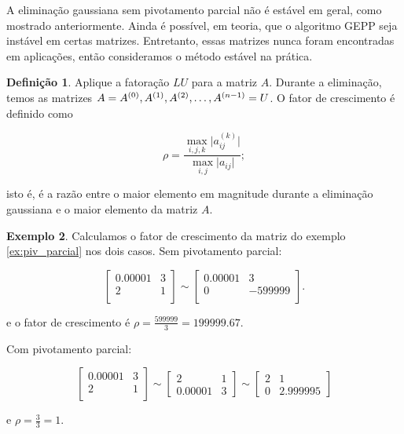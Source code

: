 \documentclass{article}
\theoremstyle{plain}
\theoremstyle{definition}
\newtheorem{defn}{Definição}[section]
\newtheorem{exmp}[defn]{Exemplo}
\theoremstyle{remark}
\begin{document}
A eliminação gaussiana sem pivotamento parcial não é estável em geral, como mostrado anteriormente. Ainda é possível, em teoria, que o algoritmo GEPP seja instável em certas matrizes. Entretanto, essas matrizes nunca foram encontradas em aplicações, então consideramos o método estável na prática.

\begin{defn}
  Aplique a fatoração \(LU\) para a matriz \(A\). Durante a eliminação, temos as matrizes \(A = A^{(0)}, A^{(1)},\\ A^{(2)}, \ldots, A^{(n-1)} = U\). O fator de crescimento é definido como

  \begin{equation}
    \rho = \frac{\max_{i, j, k}\vert a_{ij}^{(k)} \vert}{\max_{i, j}\vert a_{ij} \vert};
  \end{equation}

  \noindent isto é, é a razão entre o maior elemento em magnitude durante a eliminação gaussiana e o maior elemento da matriz \(A\).
\end{defn}

\begin{exmp}
  Calculamos o fator de crescimento da matriz do exemplo \ref{ex:piv_parcial} nos dois casos. Sem pivotamento parcial:

  \begin{equation*}
    \begin{bmatrix}
      0.00001 & 3 \\
      2 & 1 \\
    \end{bmatrix}
    \sim
    \begin{bmatrix}
      0.00001 & 3 \\
      0 & -599999 \\
    \end{bmatrix}.
  \end{equation*}

  \noindent e o fator de crescimento é \(\rho = \frac{599999}{3} = 199999.67\). 
  
  Com pivotamento parcial:

  \begin{equation*}
    \begin{bmatrix}
      0.00001 & 3 \\
      2 & 1 \\
    \end{bmatrix}
    \sim
    \begin{bmatrix}
      2 & 1 \\
      0.00001 & 3
    \end{bmatrix}
    \sim
    \begin{bmatrix}
      2 & 1 \\
      0 & 2.999995  
    \end{bmatrix}
  \end{equation*}

  \noindent e \(\rho = \frac{3}{3} = 1\).

\end{exmp}
\end{document}
